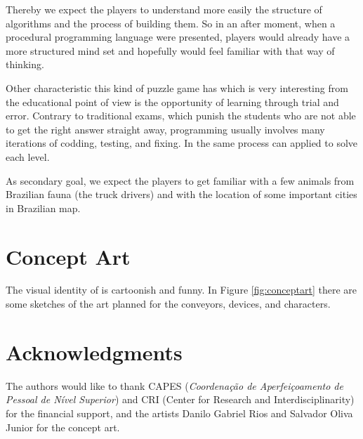 \documentclass{sigchi}
\begin{document}
    Thereby we expect the players to understand more easily the structure of
    algorithms and the process of building them. So in an after moment, when a
    procedural programming language were presented, players would already have a
    more structured mind set and hopefully would feel familiar with that way of
    thinking.

    Other characteristic this kind of puzzle game has which is very interesting
    from the educational point of view is the opportunity of learning through
    trial and error. Contrary to traditional exams, which punish the students
    who are not able to get the right answer straight away, programming usually
    involves many iterations of codding, testing, and fixing. In \gamename the
    same process can applied to solve each level.

    As secondary goal, we expect the players to get familiar with a few animals
    from Brazilian fauna (the truck drivers) and with the location of some
    important cities in Brazilian map.

\section{Concept Art}
    The visual identity of \gamename is cartoonish and funny. In Figure
    \ref{fig:conceptart} there are some sketches of the art planned for the
    conveyors, devices, and characters.

\section{Acknowledgments}
    The authors would like to thank CAPES (\textit{Coordena\c{c}\~ao de
    Aperfei\c{c}oamento de Pessoal de N\'ivel Superior}) and CRI (Center for
    Research and Interdisciplinarity) for the financial support, and the artists
    Danilo Gabriel Rios and Salvador Oliva Junior for the concept art.

%
%
%
%
%
\balance



\end{document}
